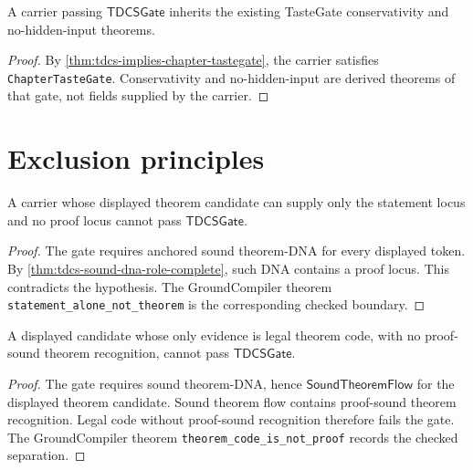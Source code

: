 \begin{corollary}
\label{cor:tdcs-inherits-derived-display-obligations}
A carrier passing $\mathsf{TDCSGate}$ inherits the existing TasteGate
conservativity and no-hidden-input theorems.
\end{corollary}
\begin{proof}
By \autoref{thm:tdcs-implies-chapter-tastegate}, the carrier satisfies
\texttt{ChapterTasteGate}. Conservativity and no-hidden-input are derived
theorems of that gate, not fields supplied by the carrier.
\end{proof}

\section{Exclusion principles}
\label{sec:tdcs-exclusion-principles}

\begin{theorem}
\label{thm:tdcs-statement-only-carriers-cannot-pass}
A carrier whose displayed theorem candidate can supply only the statement
locus and no proof locus cannot pass $\mathsf{TDCSGate}$.
\end{theorem}
\begin{proof}
The gate requires anchored sound theorem-DNA for every displayed token. By
\autoref{thm:tdcs-sound-dna-role-complete}, such DNA contains a proof locus.
This contradicts the hypothesis. The GroundCompiler theorem
\texttt{statement\_alone\_not\_theorem} is the corresponding checked boundary.
\end{proof}

\begin{theorem}
\label{thm:tdcs-code-only-carriers-cannot-pass}
A displayed candidate whose only evidence is legal theorem code, with no
proof-sound theorem recognition, cannot pass $\mathsf{TDCSGate}$.
\end{theorem}
\begin{proof}
The gate requires sound theorem-DNA, hence $\mathsf{SoundTheoremFlow}$ for the
displayed theorem candidate. Sound theorem flow contains proof-sound theorem
recognition. Legal code without proof-sound recognition therefore fails the
gate. The GroundCompiler theorem \texttt{theorem\_code\_is\_not\_proof}
records the checked separation.
\end{proof}

